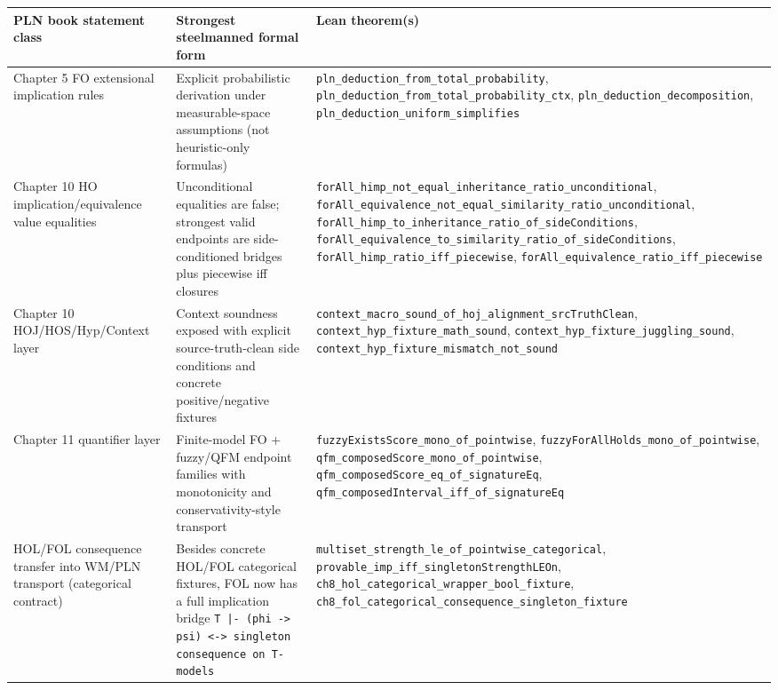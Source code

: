 \documentclass[]{article}
\newcommand{\code}[1]{\texttt{#1}}
\begin{document}
\begin{longtable}{p{}p{}p{}}
\textbf{PLN book statement class} & \textbf{Strongest steelmanned formal form} & \textbf{Lean theorem(s)} \\
\hline
Chapter 5 FO extensional implication rules & Explicit probabilistic derivation under measurable-space assumptions (not heuristic-only formulas) & \code{pln\_deduction\_from\_total\_probability},
\code{pln\_deduction\_from\_total\_probability\_ctx},
\code{pln\_deduction\_decomposition},
\code{pln\_deduction\_uniform\_simplifies} \\
\hline
Chapter 10 HO implication/equivalence value equalities & Unconditional equalities are false; strongest valid endpoints are side-conditioned bridges plus piecewise iff closures & \code{forAll\_himp\_not\_equal\_inheritance\_ratio\_unconditional},
\code{forAll\_equivalence\_not\_equal\_similarity\_ratio\_unconditional},
\code{forAll\_himp\_to\_inheritance\_ratio\_of\_sideConditions},
\code{forAll\_equivalence\_to\_similarity\_ratio\_of\_sideConditions},
\code{forAll\_himp\_ratio\_iff\_piecewise},
\code{forAll\_equivalence\_ratio\_iff\_piecewise} \\
\hline
Chapter 10 HOJ/HOS/Hyp/Context layer & Context soundness exposed with explicit source-truth-clean side conditions and concrete positive/negative fixtures & \code{context\_macro\_sound\_of\_hoj\_alignment\_srcTruthClean},
\code{context\_hyp\_fixture\_math\_sound},
\code{context\_hyp\_fixture\_juggling\_sound},
\code{context\_hyp\_fixture\_mismatch\_not\_sound} \\
\hline
Chapter 11 quantifier layer & Finite-model FO + fuzzy/QFM endpoint families with monotonicity and conservativity-style transport & \code{fuzzyExistsScore\_mono\_of\_pointwise},
\code{fuzzyForAllHolds\_mono\_of\_pointwise},
\code{qfm\_composedScore\_mono\_of\_pointwise},
\code{qfm\_composedScore\_eq\_of\_signatureEq},
\code{qfm\_composedInterval\_iff\_of\_signatureEq} \\
\hline
HOL/FOL consequence transfer into WM/PLN transport (categorical contract) & Besides concrete HOL/FOL categorical fixtures, FOL now has a full implication bridge \code{T |- (phi -> psi) <-> singleton consequence on T-models} & \code{multiset\_strength\_le\_of\_pointwise\_categorical},
\code{provable\_imp\_iff\_singletonStrengthLEOn},
\code{ch8\_hol\_categorical\_wrapper\_bool\_fixture},
\code{ch8\_fol\_categorical\_consequence\_singleton\_fixture} \\
\hline
\end{longtable}
\end{document}
